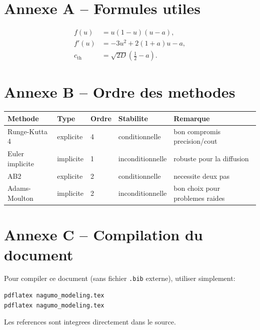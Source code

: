 \documentclass[11pt,a4paper]{report}
\begin{document}
\section*{Annexe A -- Formules utiles}
\begin{align*}
 f(u)   &= u(1-u)(u-a), \\
 f'(u)  &= -3u^2+2(1+a)u-a, \\
 c_{\mathrm{th}} &= \sqrt{2D}\left(\frac12-a\right).
\end{align*}

\section*{Annexe B -- Ordre des methodes}
\begin{longtable}{@{}p{4cm}p{2cm}p{2cm}p{2cm}p{4cm}@{}}
\toprule
Methode & Type & Ordre & Stabilite & Remarque \\
\midrule
Runge-Kutta 4 & explicite & 4 & conditionnelle & bon compromis precision/cout \\
Euler implicite & implicite & 1 & inconditionnelle & robuste pour la diffusion \\
AB2 & explicite & 2 & conditionnelle & necessite deux pas \\
Adams-Moulton & implicite & 2 & inconditionnelle & bon choix pour problemes raides \\
\bottomrule
\end{longtable}

\section*{Annexe C -- Compilation du document}
Pour compiler ce document (sans fichier \texttt{.bib} externe), utiliser simplement:
\begin{verbatim}
pdflatex nagumo_modeling.tex
pdflatex nagumo_modeling.tex
\end{verbatim}
Les references sont integrees directement dans le source.
\end{document}
